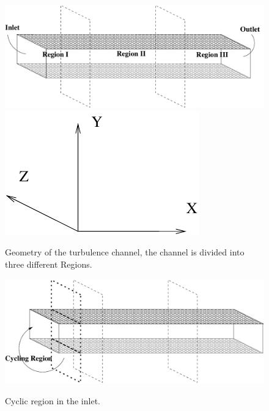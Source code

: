 \documentclass[twocolumn,10pt]{asme2e}
\begin{document}
\begin{figure}[!htbp]
	\centering
	\scalebox{0.5}
	{\includegraphics{geometry_turbchannel.pdf}}
	\scalebox{0.4}
	{\includegraphics{axis.pdf}}
	\caption{Geometry of the turbulence channel, the channel is divided into three different Regions.}
	\label{fig:geometry_turbchannel}
	\end{figure}

\begin{figure}[!htbp]
	\centering
	\scalebox{0.5}
	{\includegraphics{cycling_region.pdf}}
	\caption{Cyclic region in the inlet.}
	\label{fig:cycling_region}
\end{figure}
\end{document}
